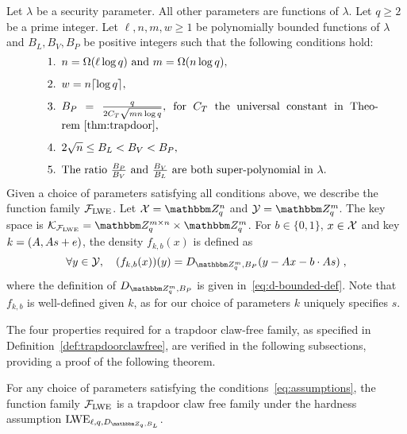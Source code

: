 
Let $\lambda$ be a security parameter. All other parameters are functions of $\lambda$. Let $q\geq 2$ be a prime integer. 
Let $\ell,n,m,w\geq 1$ be polynomially bounded functions of $\lambda$ and $B_L, B_V, B_P$ be positive integers such that the following conditions hold:
\begin{equation}\label{eq:assumptions}
    \begin{minipage}{0.9\textwidth}
\begin{enumerate}
\item  $n = \Omega(\ell \log q)$ and $m = \Omega(n\log q)$,
\item $w=n\lceil \log q\rceil$,
\item $B_P = \frac{q}{2C_T\sqrt{mn\log q}}$, for $C_T$ the universal constant in Theorem~\ref{thm:trapdoor},
\item $ 2\sqrt{n} \leq B_L < B_V < B_P$,
\item The ratio $\frac{B_P}{B_V}$ and $\frac{B_V}{B_L}$ are both super-polynomial  in $\lambda$.
\end{enumerate}
    \end{minipage}
  \end{equation}
Given a choice of parameters satisfying all conditions above, we describe the function family $\mathcal{F}_{\mathrm{LWE}}$. Let $\sX = \mZ_q^n$ and $\sY = \mZ_q^m$. 
The key space is $\mathcal{K}_{\mathcal{F}_{\lwe}} = \mZ_q^{m\times n} \times \mZ_q^m$. For $b\in \{0,1\}$, $x\in \mathcal{X}$ and key $k = (\*A,\*A\*s + \*e)$,  the density $f_{k,b}(x) $ is defined as
\begin{equation}\label{eq:defprobdensity}
  \forall y \in \sY,\quad   (f_{k,b}(x))(y) = D_{\mZ_q^m,B_P}(y - \*Ax - b\cdot \*A\*s)\;,
\end{equation}
where the definition of $D_{\mZ_q^m,B_P}$ is given in~\eqref{eq:d-bounded-def}. Note that $f_{k,b}$ is well-defined given $k$, as for our choice of parameters $k$ uniquely specifies $s$. 

 The four properties required for a trapdoor claw-free family, as specified in Definition~\ref{def:trapdoorclawfree}, are verified in the following subsections, providing a proof of the following theorem.

\begin{theorem}\label{thm:lwetcf}
For any choice of parameters satisfying the conditions~\eqref{eq:assumptions}, the function family $\mathcal{F}_{\mathrm{LWE}}$ is a trapdoor claw free family under the hardness assumption $\lwe_{\ell,q,D_{\mZ_q,B_L}}$. 
\end{theorem}

